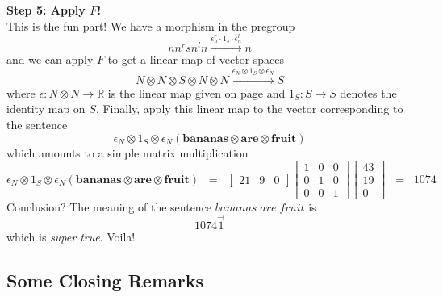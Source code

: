 \documentclass{tufte-handout-tai}
\theoremstyle{plain}
\theoremstyle{definition}
\theoremstyle{remark}
\begin{document}
	


\vspace{0.4cm}
\noindent\textbf{\large Step 5: Apply $F$!}\\[10pt]

\noindent This is the fun part! We have a morphism in the pregroup
\[nn^rsn^ln\overset{\epsilon_n^r\cdot 1_s\cdot \epsilon_n^l}{\longrightarrow} n\]
and we can apply $F$ to get a linear map of vector spaces
\[N\otimes N\otimes S\otimes N\otimes N\overset{\epsilon_N\otimes 1_S\otimes \epsilon_N}{\longrightarrow}S\]
where $\epsilon\colon N\otimes N\to \mathbb{R}$ is the linear map given on page \pageref{lis:ucounit} and $1_S\colon S\to S$ denotes the identity map on $S$. Finally, apply this linear map to the vector corresponding to the sentence
\[\epsilon_N\otimes 1_S\otimes \epsilon_N(\mathbf{bananas}\otimes \mathbf{are}\otimes \mathbf{fruit})\]
which amounts to a simple matrix multiplication
\[\epsilon_N\otimes 1_S\otimes \epsilon_N(\mathbf{bananas}\otimes \mathbf{are}\otimes \mathbf{fruit})
\;\;=\;\; \begin{bmatrix}21 & 9 & 0
\end{bmatrix}
\begin{bmatrix}
1 & 0 & 0\\
0 & 1 & 0\\
0 & 0 & 1
\end{bmatrix}
\begin{bmatrix}
43\\ 
19\\
0
\end{bmatrix} \;\;=\;\; 1074\]
Conclusion? The meaning of the sentence $bananas\;are\;fruit$ is 
\[1074\vec{1}\]
which is \textit{super true}. Voila!

\newpage
\subsection*{Some Closing Remarks} 
\end{document}
